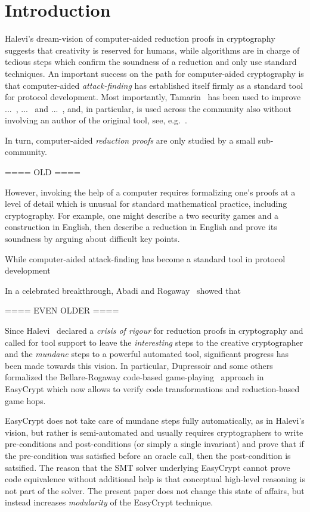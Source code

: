 \section{Introduction}
Halevi's dream-vision of computer-aided reduction proofs in cryptography~\cite{Halevi} suggests that creativity is reserved for humans, while algorithms are in charge of tedious steps which confirm the soundness of a reduction and only use standard techniques. An important success on the path for computer-aided cryptography is that computer-aided \emph{attack-finding} has established itself firmly as a standard tool for protocol development. Most importantly, Tamarin~\cite{X} has been used to improve ...~\cite{X}, ...~\cite{X} and ...~\cite{X}, and, in particular, is used across the community also without involving an author of the original tool, see, e.g.~\cite{X}.

In turn, computer-aided \emph{reduction proofs} are only studied by a small sub-community. 

==== OLD ====

However, invoking the help of a computer requires formalizing one's proofs at a level of detail which is unusual for standard mathematical practice, including cryptography. For example, one might describe a two security games and a construction in English, then describe a reduction in English and prove its soundness by arguing about difficult key points.

While computer-aided attack-finding has become a standard tool in protocol development


In a celebrated breakthrough, Abadi and Rogaway~\cite{X} showed that 









==== EVEN OLDER ====


Since Halevi~\cite{X} declared a \emph{crisis of rigour} for reduction proofs in cryptography
and called for tool support to leave the \emph{interesting} steps to the creative cryptographer
and the \emph{mundane} steps to a powerful automated tool, significant progress has been made
towards this vision. In particular, Dupressoir and some others~\cite{X} formalized the Bellare-Rogaway
code-based game-playing~\cite{X} approach in EasyCrypt which now allows to verify code transformations
and reduction-based game hops. 

EasyCrypt does not take care of mundane steps fully automatically, as in Halevi's vision, but rather is semi-automated
and usually requires cryptographers to write pre-conditions and post-conditions (or simply a single invariant) and prove
that if the pre-condition was satisfied before an oracle call, then the post-condition is satsified.
The reason that the SMT solver underlying EasyCrypt cannot prove code equivalence without additional
help is that conceptual high-level reasoning is not part of the solver. The present paper does not
change this state of affairs, but instead increases \emph{modularity} of the EasyCrypt technique.

